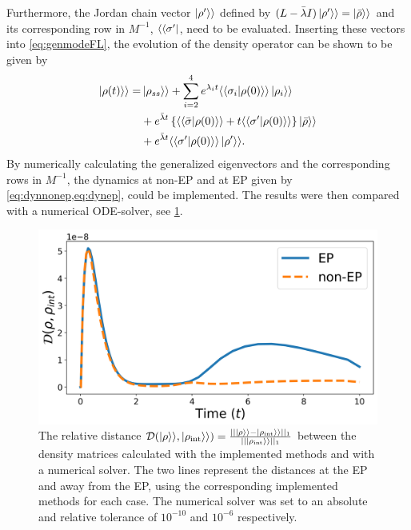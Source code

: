 \documentclass[../main.tex]{subfiles}
\begin{document}
Furthermore, the Jordan chain vector $\ket{\rho'}\rangle$ defined by $(L - \bar\lambda I)\ket{\rho'}\rangle = \ket{\bar\rho}\rangle$ and its corresponding row in $M^{-1}$, $\langle\bra{\sigma'}$, need to be evaluated. Inserting these vectors into \cref{eq:genmodeFL}, the evolution of the density operator can be shown to be given by
\begin{equation}\label{eq:dynep}
    \begin{aligned}
        \ket{\rho(t)}\rangle = &\ket{\rho_{ss}}\rangle + \sum_{i=2}^4 e^{\lambda_i t} \langle\braket{\sigma_i|\rho(0)}\rangle \ket{\rho_i}\rangle \\ 
                               & + e^{\bar \lambda t}\left\{\langle\braket{\bar\sigma|\rho(0)}\rangle + t\langle\braket{\sigma'|\rho(0)}\rangle \right\}\ket{\bar \rho}\rangle \\ 
                               & + e^{\bar\lambda t} \langle\braket{\sigma'|\rho(0)}\rangle\ket{\rho'}\rangle.
    \end{aligned}
\end{equation}
By numerically calculating the generalized eigenvectors and the corresponding rows in $M^{-1}$, the dynamics at non-EP and at EP given by \cref{eq:dynnonep,eq:dynep}, could be implemented. The results were then compared with a numerical ODE-solver, see \cref{fig:minevsint}.

\begin{figure}[H]
    \centering
    \includegraphics[width=0.7\linewidth]{figures/minevsint.png}
    \caption{The relative distance $\mathcal{D}(\ket{\rho}\rangle, \ket{\rho_\text{int}}\rangle) = \frac{||\ket{\rho}\rangle - \ket{\rho_\text{int}}\rangle||_1}{||\ket{\rho_\text{int}}\rangle||_1}$ between the density matrices calculated with the implemented methods and with a numerical solver. The two lines represent the distances at the EP and away from the EP, using the corresponding implemented methods for each case. The numerical solver was set to an absolute and relative tolerance of $10^{-10}$ and $10^{-6}$ respectively.}
    \label{fig:minevsint}
\end{figure}
\end{document}
